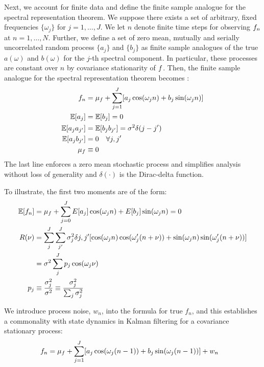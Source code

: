 Next, we account for finite data and define the finite sample analogue for the spectral representation theorem. We suppose there exists a set of arbitrary, fixed frequencies  $\{\omega_j\}$  for $j = 1, \hdots , J$. We let $n$ denote finite time steps for observing $f_n$ at $n= 1, \hdots, N$. Further, we define a set of zero mean, mutually and serially uncorrelated random process  $\{a_j \}$ and $\{b_j\}$ as finite sample analogues of the true  $a(\omega)$ and $b(\omega)$ for the $j$-th spectral component. In particular, these processes are constant over $n$ by covariance stationarity of $f$. Then, the finite sample analogue for the spectral representation theorem becomes \cite{hamilton1994time}:
\begin{align} 
f_n &= \mu_f  + \sum_{j=1}^{J}  [ a_j \cos(\omega_j n) +  b_j \sin(\omega_j n) ] \\
\mathbb{E}[a_j] & = \mathbb{E}[b_j] = 0\\
\mathbb{E}[a_ja_{j'}] &= \mathbb{E}[b_jb_{j'}] = \sigma^2 \delta(j - j') \\
\mathbb{E}[a_jb_{j'}] &= 0 \quad \forall j, j' \\
\mu_f &\equiv 0 
\end{align} The last line enforces a zero mean stochastic process and simplifies analysis without loss of generality  and  $\delta(\cdot)$ is the Dirac-delta function. 

To illustrate, the first two moments are of the form:
\begin{align}
\mathbb{E}[f_n] &=  \mu_f +  \sum_{j=0}^{J} E[a_j] \cos(\omega_j n) + E[b_j] \sin(\omega_j n)  = 0\\
R(\nu) &= \sum_j^{J} \sum_{j'}^{J} \sigma_j^2\delta{j,j'} [\cos(\omega_j n)\cos(\omega_j' (n+\nu)) + \sin(\omega_j n)\sin(\omega_j' (n+\nu)) ]\\
&= \sigma^2 \sum_j^{J}  p_j \cos(\omega_j\nu) \label{eqn:app:spectral:Rvtrue} \\
p_j & \equiv \frac{\sigma_j^2}{\sigma^2} \equiv \frac{\sigma_j^2}{\sum_j \sigma_j^2} 
\end{align}

We introduce process noise, $w_n$, into the formula for true $f_n$, and this establishes a commonality with state dynamics in Kalman filtering for a covariance stationary process:
\begin{align} 
f_n &= \mu_f  + \sum_{j=1}^{J}  [ a_j \cos(\omega_j (n-1)) +  b_j \sin(\omega_j (n-1)) ] + w_n 
\end{align}


